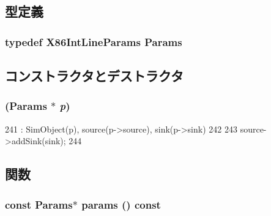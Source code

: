 \subsection{型定義}
\hypertarget{classX86ISA_1_1IntLine_ae5b9ed84d6ad38984c5cc38e7336020d}{
\subsubsection[{Params}]{\setlength{\rightskip}{0pt plus 5cm}typedef X86IntLineParams {\bf Params}}}
\label{classX86ISA_1_1IntLine_ae5b9ed84d6ad38984c5cc38e7336020d}


\subsection{コンストラクタとデストラクタ}
\hypertarget{classX86ISA_1_1IntLine_ae188605f462d7a161f2792c8d052a8ab}{
\subsubsection[{IntLine}]{ ({\bf Params} $\ast$ {\em p})}}
\label{classX86ISA_1_1IntLine_ae188605f462d7a161f2792c8d052a8ab}



\begin{DoxyCode}
241                        : SimObject(p), source(p->source), sink(p->sink)
242     {
243         source->addSink(sink);
244     }
\end{DoxyCode}


\subsection{関数}
\hypertarget{classX86ISA_1_1IntLine_acd3c3feb78ae7a8f88fe0f110a718dff}{
\subsubsection[{params}]{\setlength{\rightskip}{0pt plus 5cm}const {\bf Params}$\ast$ params () const}}
\label{classX86ISA_1_1IntLine_acd3c3feb78ae7a8f88fe0f110a718dff}



